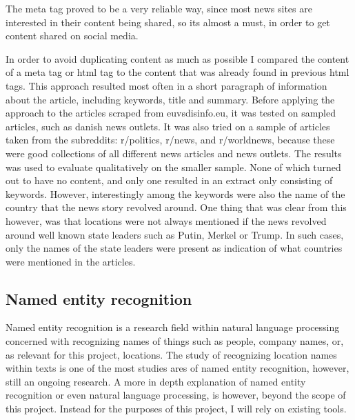 \documentclass{article}
\begin{document}
The meta tag proved to be a very reliable way, since most news sites are interested in their content being shared, so its almost a must, in order to get content shared on social media.

In order to avoid duplicating content as much as possible I compared the content of a meta tag or html tag to the content that was already found in previous html tags. This approach resulted most often in a short paragraph of information about the article, including keywords, title and summary. Before applying the approach to the articles scraped from euvsdisinfo.eu, it was tested on sampled articles, such as danish news outlets. It was also tried on a sample of articles taken from the subreddits: r/politics, r/news, and r/worldnews, because these were good collections of all different news articles and news outlets. The results was used to evaluate qualitatively on the smaller sample. None of which turned out to have no content, and only one resulted in an extract only consisting of keywords. However, interestingly among the keywords were also the name of the country that the news story revolved around.
One thing that was clear from this however, was that locations were not always mentioned if the news revolved around well known state leaders such as Putin, Merkel or Trump. In such cases, only the names of the state leaders were present as indication of what countries were mentioned in the articles.

\subsection{Named entity recognition}
Named entity recognition is a research field within natural language processing concerned with recognizing names of things such as people, company names, or, as relevant for this project, locations. The study of recognizing location names within texts is one of the most studies ares of named entity recognition, however, still an ongoing research. A more in depth explanation of named entity recognition or even natural language processing, is however, beyond the scope of this project. Instead for the purposes of this project, I will rely on existing tools.
\end{document}
